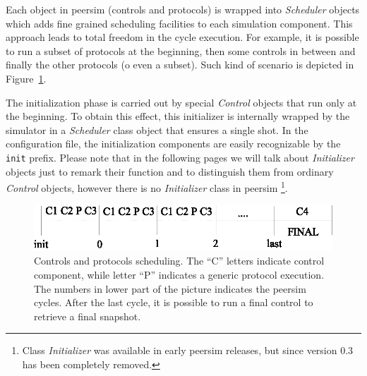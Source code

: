 \documentclass[a4paper,11pt]{article}
\begin{document}
Each object in peersim (controls and protocols) is wrapped into
\emph{Scheduler} objects which adds fine grained scheduling facilities to each
simulation component. This approach leads to total freedom in the
cycle execution. For example, it is possible to run a subset of
protocols at the beginning, then some controls in between and finally
the other protocols (o even a subset). Such kind of scenario is depicted in
Figure~\ref{obsfigure}. 

The initialization phase is carried out by special \emph{Control}
objects that run only at the beginning. To obtain this effect, this
initializer is internally wrapped by the simulator in a \emph{Scheduler} 
class object that ensures a single shot. In the configuration file,
the initialization components are easily recognizable by the
\texttt{init} prefix. Please note that in the following pages we will
talk about \emph{Initializer} objects just to remark their function and
to distinguish them from ordinary \emph{Control} objects, however there
is no \emph{Initializer} class in peersim
\footnote{Class
  \emph{Initializer} was available in early peersim releases, but
  since version 0.3 has been completely removed.}.



\begin{figure}
\begin{center}
\includegraphics[scale=1.1]{controls-protocols.eps}
\end{center}
\caption{Controls and protocols scheduling. The ``C'' letters indicate
  control component, while letter ``P'' indicates a generic protocol
  execution. The numbers in lower part of the picture indicates the
  peersim cycles. After the last cycle, it is possible to run a final
  control to retrieve a final snapshot.\label{obsfigure}}
\end{figure}
\end{document}
